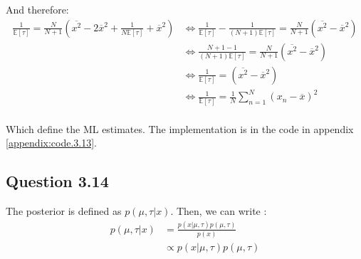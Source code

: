 \documentclass{article}
\begin{document}
And therefore:
\begin{equation}
    \begin{split}
        \frac{1}{\mathbb{E}[\tau]} = \frac{N}{N+1}\left(\overline{x^2} - 2\overline{x}^2 + \frac{1}{N\mathbb{E}[\tau]} + \overline{x}^2\right) & \Leftrightarrow \frac{1}{\mathbb{E}[\tau]} - \frac{1}{(N+1)\mathbb{E}[\tau]} = \frac{N}{N+1}\left(\overline{x^2} - \overline{x}^2\right) \\
                                                                                                                                               & \Leftrightarrow \frac{N+1-1}{(N+1)\mathbb{E}[\tau]} = \frac{N}{N+1}\left(\overline{x^2} - \overline{x}^2\right)                          \\
                                                                                                                                               & \Leftrightarrow \frac{1}{\mathbb{E}[\tau]} = \left(\overline{x^2} - \overline{x}^2\right)                                                \\
                                                                                                                                               & \Leftrightarrow \frac{1}{\mathbb{E}[\tau]} = \frac{1}{N}\sum_{n=1}^{N}(x_n - \overline{x})^2                                             \\
    \end{split}
\end{equation}

Which define the ML estimates. The implementation is in the code in appendix \ref{appendix:code.3.13}.

\subsection*{Question 3.14}

The posterior is defined as $p(\mu, \tau|x)$. Then, we can write :
\begin{equation}
    \begin{split}
        p(\mu, \tau|x) & = \frac{p(x|\mu, \tau)p(\mu, \tau)}{p(x)} \\
                       & \propto p(x|\mu, \tau)p(\mu, \tau)
    \end{split}
\end{equation}
\end{document}
